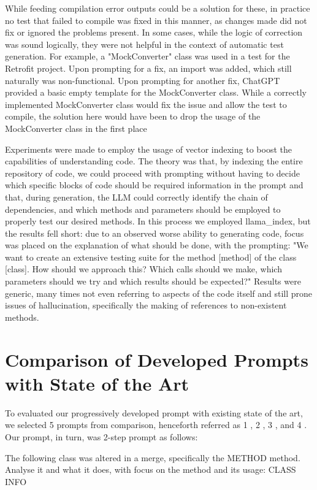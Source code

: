 While feeding compilation error outputs could be a solution for these, in practice no test that failed to compile was fixed in this manner, as changes made did not fix or ignored the problems present. In some cases, while the logic of correction was sound logically, they were not helpful in the context of automatic test generation. For example, a "MockConverter" class was used in a test for the Retrofit project. Upon prompting for a fix, an import was added, which still naturally was non-functional. Upon prompting for another fix, ChatGPT provided a basic empty template for the MockConverter class. While a correctly implemented MockConverter class would fix the issue and allow the test to compile, the solution here would have been to drop the usage of the MockConverter class in the first place

Experiments were made to employ the usage of vector indexing to boost the capabilities of understanding code. The theory was that, by indexing the entire repository of code, we could proceed with prompting without having to decide which specific blocks of code should be required information in the prompt and that, during generation, the LLM could correctly identify the chain of dependencies, and which methods and parameters should be employed to properly test our desired methods. In this process we employed llama\_index, but the results fell short: due to an observed worse ability to generating code, focus was placed on the explanation of what should be done, with the prompting: "We want to create an extensive testing suite for the method [method] of the class [class]. How should we approach this? Which calls should we make, which parameters should we try and which results should be expected?"
Results were generic, many times not even referring to aspects of the code itself and still prone issues of hallucination, specifically the making of references to non-existent methods.

\section{Comparison of Developed Prompts with State of the Art}

To evaluated our progressively developed prompt with existing state of the art, we selected 5 prompts from comparison, henceforth referred as 1 \cite{kn:chattester}, 2 \cite{kn:siddiq2023empirical}, 3 \cite{kn:gptunitbra}, and 4 \cite{kn:chatunitest}. Our prompt, in turn, was 2-step prompt as follows:

\begin{prompt}
The following class was altered in a merge, specifically the METHOD method. Analyse it and what it does, with focus on the method and its usage: CLASS INFO
\end{prompt}


